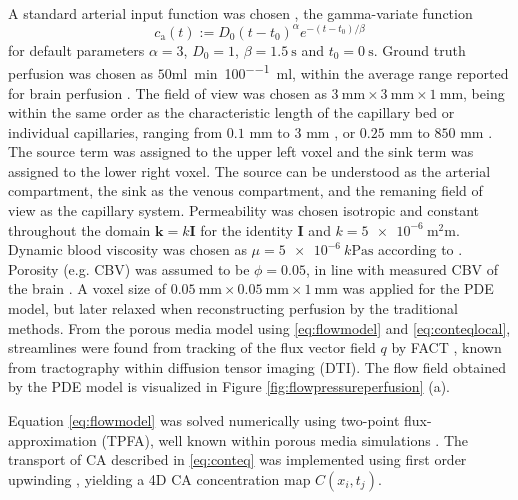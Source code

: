 \documentclass[journal,twocolumn]{IEEEtran}
\newcommand{\Qso}{Q_{\mathrm{so}}}
\newcommand{\Qsi}{Q_{\mathrm{si}}}
\newcommand{\ca}{c_\mathrm{a}}
\newcommand{\simu}{k\pascal\second}
\newcommand{\siFmm}{\milli\meter\cubed\per\second}
\newcommand{\siPml}{\milli\litre\per\minute\per100\milli\litre}
\begin{document}
	A standard arterial input function was chosen \cite{ostergaard96}, the gamma-variate function
	\begin{equation}
		\ca(t) := D_0(t-t_0)^\alpha e^{-(t-t_0)/\beta}
	\end{equation}
	for default parameters $\alpha=3$, $D_0 = 1$, $\beta = \SI{1.5}{\second}$ and $t_0 = \SI{0}{\second}$.
	Ground truth perfusion was chosen as $50$\si{\siPml}, within the average range reported for brain perfusion \cite{Obrist1984,Smith00}. The field of view was chosen as $\SI{3}{\milli\meter}\times\SI{3}{\milli\meter}\times\SI{1}{\milli\meter}$, being within the same order as the characteristic length of the capillary bed or individual capillaries, ranging from $0.1$ mm to $3$ mm \cite{Cho2011}, or $0.25$ mm to $850$ mm \cite{Townsley2012}.
	The source term was assigned to the upper left voxel and the sink term was assigned to the lower right voxel. The source can be understood as the arterial compartment, the sink as the venous compartment, and the remaning field of view as the capillary system. 
	Permeability was chosen isotropic and constant throughout the domain $\mathbf{k}=k\mathbf{I}$ for the identity $\mathbf{I}$ and $k=\SI{5e-6}{\square\milli\meter}$.
	Dynamic blood viscosity was chosen as $\mu=\SI{5e-6}{\simu}$ according to \cite{rosencranz06}.
	Porosity (e.g. CBV) was assumed to be $\phi = 0.05$, in line with measured CBV of the brain \cite{Smith00}.
A voxel size of $\SI{0.05}{\milli\meter} \times\SI{0.05}{\milli\meter}\times\SI{1}{\milli\meter}$ was applied for the PDE model, but later relaxed when reconstructing perfusion by the traditional methods. From the porous media model using \eqref{eq:flowmodel} and \eqref{eq:conteqlocal}, streamlines were found from tracking of the flux vector field $q$ by FACT \cite{Mori1998}, known from  tractography within diffusion tensor imaging (DTI). 
	The flow field obtained by the PDE model is visualized in Figure \ref{fig:flowpressureperfusion} (a).
	
	Equation \eqref{eq:flowmodel} was solved numerically using two-point flux-approximation (TPFA), well known within porous media simulations \cite{Aarnes2007}.
	The transport of CA described in \eqref{eq:conteq} was implemented using first order upwinding \cite{Patankar80}, yielding a 4D CA concentration map $C(x_i,t_j)$.
		
\end{document}
